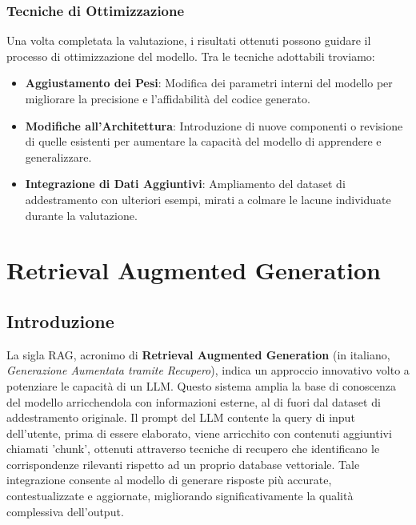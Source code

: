 \documentclass[12pt,a4paper,openright,twoside]{book}
\begin{document}
\subsection{Tecniche di Ottimizzazione}
Una volta completata la valutazione, i risultati ottenuti possono guidare il processo di ottimizzazione del modello. Tra le tecniche adottabili troviamo:
\begin{itemize}
    \item \textbf{Aggiustamento dei Pesi}: Modifica dei parametri interni del modello per migliorare la precisione e l'affidabilità del codice generato.
    \item \textbf{Modifiche all'Architettura}: Introduzione di nuove componenti o revisione di quelle esistenti per aumentare la capacità del modello di apprendere e generalizzare.
    \item \textbf{Integrazione di Dati Aggiuntivi}: Ampliamento del dataset di addestramento con ulteriori esempi, mirati a colmare le lacune individuate durante la valutazione.
\end{itemize}

\chapter{Retrieval Augmented Generation}
\section{Introduzione} 
La sigla RAG, acronimo di \textbf{Retrieval Augmented Generation} (in italiano, \textit{Generazione Aumentata tramite Recupero}), indica un approccio innovativo volto a potenziare le capacità di un \ac{LLM}.
Questo sistema amplia la base di conoscenza del modello arricchendola con informazioni esterne, al di fuori dal dataset di addestramento originale.
Il prompt del \ac{LLM} contente la query di input dell'utente, prima di essere elaborato, viene arricchito con contenuti aggiuntivi chiamati 'chunk', ottenuti attraverso tecniche di recupero che identificano le corrispondenze rilevanti rispetto ad un proprio database vettoriale.
Tale integrazione consente al modello di generare risposte più accurate, contestualizzate e aggiornate, migliorando significativamente la qualità complessiva dell’output.
\end{document}
